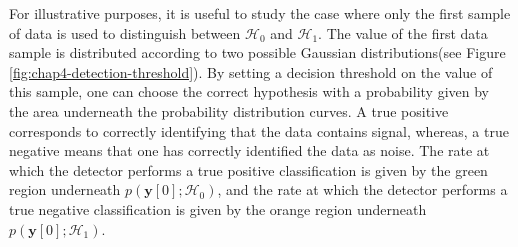 For illustrative purposes, it is useful to study the case where only the first sample of data is used to distinguish between $\mathcal{H}_0$ and $\mathcal{H}_1$. The value of the first data sample is distributed according to two possible Gaussian distributions(see Figure \ref{fig:chap4-detection-threshold}). By setting a decision threshold on the value of this sample, one can choose the correct hypothesis with a probability given by the area underneath the probability distribution curves. A true positive corresponds to correctly identifying that the data contains signal, whereas, a true negative means that one has correctly identified the data as noise. The rate at which the detector performs a true positive classification is given by the green region underneath $p(\bm{y}[0];\mathcal{H}_0)$, and the rate at which the detector performs a true negative classification is given by the orange region underneath $p(\bm{y}[0];\mathcal{H}_1)$.
